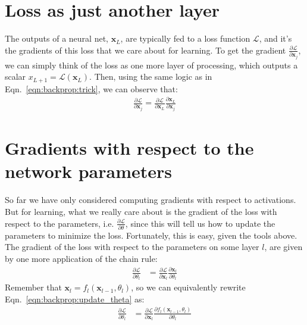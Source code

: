 
\section{Loss as just another layer}
The outputs of a neural net, $\mathbf{x}_{L}$, are typically fed to a loss function $\mathcal{L}$, and it's the gradients of this loss that we care about for learning. To get the gradient $\frac{\partial \mathcal{L}}{\partial \mathbf{x}_{j}}$, we can simply think of the loss as one more layer of processing, which outputs a scalar $x_{L+1} = \mathcal{L}(\mathbf{x}_L)$. Then, using the same logic as in Eqn.~\ref{eqn:backprop:trick}, we can observe that:
\begin{align}
    \frac{\partial \mathcal{L}}{\partial \mathbf{x}_{j}} = \frac{\partial \mathcal{L}}{\partial \mathbf{x}_{L}} \frac{\partial \mathbf{x}_{L}}{\partial \mathbf{x}_{j}}\label{eqn:backprop:backprop_through_loss}
\end{align}

\section{Gradients with respect to the network parameters}
So far we have only considered computing gradients with respect to activations. But for learning, what we really care about is the gradient of the loss with respect to the parameters, i.e. $\frac{\partial \mathcal{L}}{\partial \theta}$, since this will tell us how to update the parameters to minimize the loss. Fortunately, this is easy, given the tools above. The gradient of the loss with respect to the parameters on some layer $l$, are given by one more application of the chain rule:
\begin{align}
\frac{\partial \mathcal{L}}{\partial \theta_l} &= \frac{\partial \mathcal{L}}{\partial \mathbf{x}_{l}} \frac{\partial \mathbf{x}_{l}}{\partial \theta_l} \label{eqn:backprop:update_theta}
\end{align}
Remember that $\mathbf{x}_{l} = f_l(\mathbf{x}_{l-1}, \theta_l)$, so we can equivalently rewrite Eqn.~\ref{eqn:backprop:update_theta} as:
\begin{align}
\frac{\partial \mathcal{L}}{\partial \theta_l} &= \frac{\partial \mathcal{L}}{\partial \mathbf{x}_l} \frac{\partial f_l(\mathbf{x}_{l-1}, \theta_l)}{\partial \theta_l}
\end{align}


